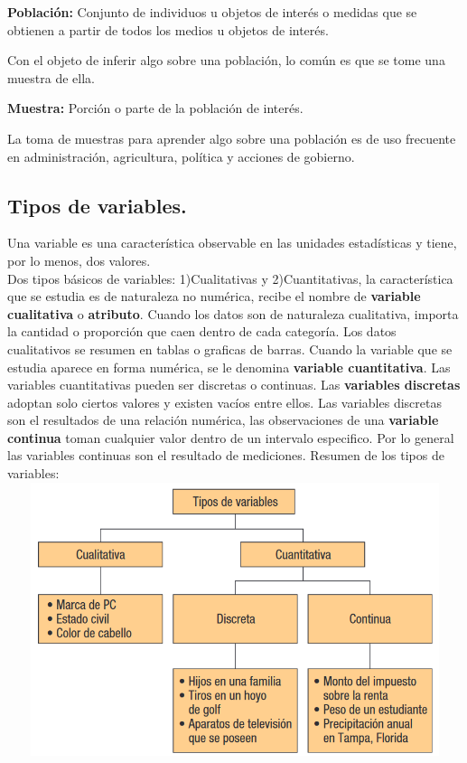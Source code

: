 \documentclass[]{article}
\begin{document}
\begin{flushleft}
	\textbf{Población: }Conjunto de individuos u objetos de interés o medidas que se obtienen a partir de todos los medios u objetos de interés.
\end{flushleft}
Con el objeto de inferir algo sobre una población, lo común es que se tome una muestra de ella.
\begin{flushleft}
	\textbf{Muestra: }Porción o parte de la población de interés.
\end{flushleft}
La toma de muestras para aprender algo sobre una población es de uso frecuente en administración, agricultura, política y acciones de gobierno.

\subsection{Tipos de variables.}
Una variable es una característica observable en las unidades estadísticas y tiene, por lo menos, dos valores. \\
Dos tipos básicos de variables: 1)Cualitativas y 2)Cuantitativas, la característica que se estudia es de naturaleza no numérica, recibe el nombre de \textbf{variable cualitativa} o \textbf{atributo}. Cuando los datos son de naturaleza cualitativa, importa la cantidad o proporción que caen dentro de cada categoría. Los datos cualitativos se resumen en tablas o graficas de barras. Cuando la variable que se estudia aparece en forma numérica, se le denomina \textbf{variable cuantitativa}. Las variables cuantitativas pueden ser discretas o continuas. Las \textbf{variables discretas} adoptan solo ciertos valores y existen vacíos entre ellos. Las variables discretas son el resultados de una relación numérica, las observaciones de una \textbf{variable continua} toman cualquier valor dentro de un intervalo especifico. Por lo general las variables continuas son el resultado de mediciones. \linebreak Resumen de los tipos de variables: \\
\includegraphics[width=14cm, height=8cm]{imagenes/resumenTiposVariables1_2}
\end{document}
